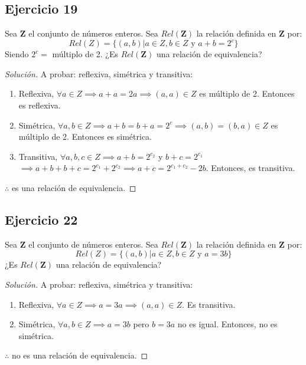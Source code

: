 \documentclass[a4paper,12pt]{article}
\newenvironment{solution}
  {\renewcommand\qedsymbol{$\blacksquare$}\begin{proof}[Solución]}
  {\end{proof}}
\begin{document}
\subsection{Ejercicio 19}
Sea $\mathbf{Z}$ el conjunto de números enteros. Sea $Rel(\mathbf{Z})$ la relación definida en $\mathbf{Z}$ por: 
$$Rel(Z)=\{(a,b)| a\in Z,b\in Z \text{ y } a+b=2^c\}$$
Siendo $2^c=$ múltiplo de 2. ¿Es $Rel(\mathbf{Z})$ una relación de equivalencia?
\begin{solution}
A probar: reflexiva, simétrica y transitiva: 
\begin{enumerate}
    \item Reflexiva, $\forall a\in Z\implies a+a =2a\implies (a,a)\in Z$ es múltiplo de 2. Entonces es reflexiva. 
    \item Simétrica, $\forall a,b \in Z\implies a+b =b+a =2^c\implies (a,b)= (b,a) \in Z$ es múltiplo de 2. Entonces es simétrica. 
    \item Transitiva, $\forall a,b,c \in Z\implies a+b=2^{c_2}$ y $b+c=2^{c_1}$ $\implies a+b+b+c=2^{c_1}+2^{c_2}\implies a+c=2^{c_1+c_2}-2b$. Entonces, es transitiva. 
\end{enumerate}
$\therefore$ es una relación de equivalencia. 
\end{solution}
\subsection{Ejercicio 22}
Sea $\mathbf{Z}$ el conjunto de números enteros. Sea $Rel(\mathbf{Z})$ la relación definida en $\mathbf{Z}$ por: 
$$Rel(Z)=\{(a,b)| a\in Z,b\in Z \text{ y } a=3b\}$$
¿Es $Rel(\mathbf{Z})$ una relación de equivalencia?
\begin{solution}
A probar: reflexiva, simétrica y transitiva:
\begin{enumerate}
    \item Reflexiva, $\forall a\in Z\implies a=3a \implies (a,a)\in Z$. Es transitiva.
    \item Simétrica, $\forall a,b\in Z\implies a=3b$ pero $b=3a$ no es igual. Entonces, no es simétrica.
\end{enumerate}
$\therefore$ no es una relación de equivalencia.
\end{solution}
\end{document}
